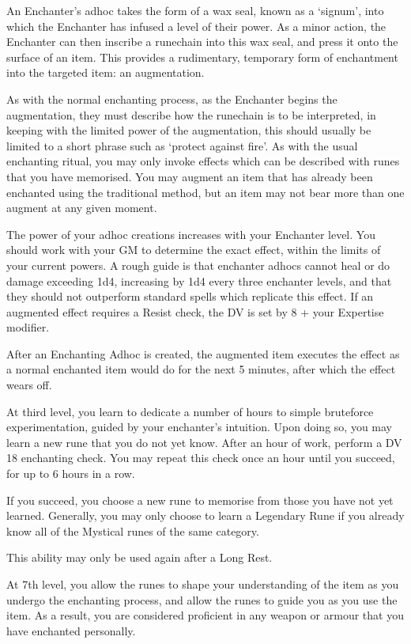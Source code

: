 {
An Enchanter's ad\minus{}hoc takes the form of a wax seal, known as a `signum', into which the Enchanter has infused a level of their power. As a minor action, the Enchanter can then inscribe a rune\minus{}chain into this wax seal, and press it onto the surface of an item. This provides a rudimentary, temporary form of enchantment into the targeted item: an augmentation. 
 
As with the normal enchanting process, as the Enchanter begins the augmentation, they must describe how the runechain is to be interpreted, in keeping with the limited power of the augmentation, this should usually be limited to a short phrase such as `protect against fire'. As with the usual enchanting ritual, you may only invoke effects which can be described with runes that you have memorised. You may augment an item that has already been enchanted using the traditional method, but an item may not bear more than one augment at any given moment. 

The power of your ad\minus{}hoc creations increases with your Enchanter level. You should work with your GM to determine the exact effect, within the limits of your current powers. A rough guide is that enchanter ad\minus{}hocs cannot heal or do damage exceeding 1d4, increasing by 1d4 every three enchanter levels, and that they should not outperform standard spells which replicate this effect. If an augmented effect requires a Resist check, the DV is set by 8 + your Expertise modifier. 
	 
After an Enchanting Ad\minus{}hoc is created, the augmented item executes the effect as a normal enchanted item would do for the next 5 minutes, after which the effect wears off.  
}

{
	At third level, you learn to dedicate a number of hours to simple brute\minus{}force experimentation, guided by your enchanter's intuition. Upon doing so, you may learn a new rune that you do not yet know. After an hour of work, perform a DV 18 enchanting check. You may repeat this check once an hour until you succeed, for up to 6 hours in a row.

	If you succeed, you choose a new rune to memorise from those you have not yet learned. Generally, you may only choose to learn a Legendary Rune if you already know all of the Mystical runes of the same category.  

	This ability may only be used again after a Long Rest.
}

{
	At 7th level, you allow the runes to shape your understanding of the item as you undergo the enchanting process, and allow the runes to guide you as you use the item. As a result, you are considered proficient in any weapon or armour that you have enchanted personally.
}

